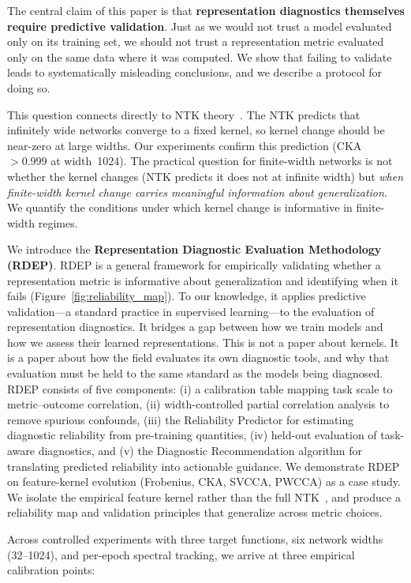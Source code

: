\documentclass[twoside,11pt]{article}
\begin{document}
The central claim of this paper is that \textbf{representation diagnostics themselves require predictive validation}. Just as we would not trust a model evaluated only on its training set, we should not trust a representation metric evaluated only on the same data where it was computed. We show that failing to validate leads to systematically misleading conclusions, and we describe a protocol for doing so.

This question connects directly to NTK theory~\citep{jacot2018neural}. The NTK predicts that infinitely wide networks converge to a fixed kernel, so kernel change should be near-zero at large widths. Our experiments confirm this prediction (CKA $>0.999$ at width~1024). The practical question for finite-width networks is not whether the kernel changes (NTK predicts it does not at infinite width) but \emph{when finite-width kernel change carries meaningful information about generalization}. We quantify the conditions under which kernel change is informative in finite-width regimes.

We introduce the \textbf{Representation Diagnostic Evaluation Methodology (RDEP)}. RDEP is a general framework for empirically validating whether a representation metric is informative about generalization and identifying when it fails (Figure~\ref{fig:reliability_map}). To our knowledge, it applies predictive validation---a standard practice in supervised learning---to the evaluation of representation diagnostics. It bridges a gap between how we train models and how we assess their learned representations. This is not a paper about kernels. It is a paper about how the field evaluates its own diagnostic tools, and why that evaluation must be held to the same standard as the models being diagnosed. RDEP consists of five components: (i) a calibration table mapping task scale to metric--outcome correlation, (ii) width-controlled partial correlation analysis to remove spurious confounds, (iii) the Reliability Predictor for estimating diagnostic reliability from pre-training quantities, (iv) held-out evaluation of task-aware diagnostics, and (v) the Diagnostic Recommendation algorithm for translating predicted reliability into actionable guidance. We demonstrate RDEP on feature-kernel evolution (Frobenius, CKA, SVCCA, PWCCA) as a case study. We isolate the empirical feature kernel rather than the full NTK~\citep{jacot2018neural}, and produce a reliability map and validation principles that generalize across metric choices.

Across controlled experiments with three target functions, six network widths (32--1024), and per-epoch spectral tracking, we arrive at three empirical calibration points:
\end{document}
